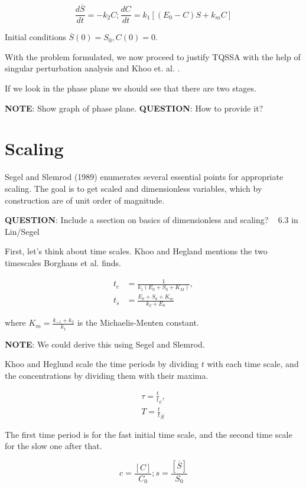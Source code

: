 \documentclass[12pt]{report}
\begin{document}
\begin{equation}
\frac{d\overline{S}}{dt} = -k_2C;
\frac{dC}{dt} = k_1[(E_0-C)S + k_mC]
\end{equation}

Initial conditions $\overline{S}(0)=S_0, C(0)=0$.

With the problem formulated, we now proceed to justify TQSSA with the help of singular perturbation analysis and Khoo et. al. \cite{Khoo}.

If we look in the phase plane we should see that there are two stages.

\textbf{NOTE}: Show graph of phase plane.
\textbf{QUESTION}: How to provide it?

\section{Scaling}

Segel and Slemrod (1989) enumerates several essential points for appropriate scaling. The goal is to get scaled and dimensionless variables, which by construction are of unit order of magnitude.

\textbf{QUESTION}: Include a ssection on basics of dimensionless and scaling? ~ 6.3 in Lin/Segel

First, let's think about time scales. Khoo and Hegland mentions the two timescales Borghans et al. finds.

\begin{align*}
t_c &= \frac{1}{k_1(E_0+S_0+K_M)}, \\
t_{\overline{s}} &= \frac{E_0+S_0+K_m}{k_2+E_0}
\end{align*}

where $K_m = \frac{k_{-1} + k_{2}}{k_1}$ is the Michaelis-Menten constant.

\textbf{NOTE}: We could derive this using Segel and Slemrod.

Khoo and Heglund scale the time periods by dividing $t$ with each time scale, and the concentrations by dividing them with their maxima.

\begin{align*}
\tau = \frac t t_c, \\
T = \frac t t_{\overline{S}}
\end{align*}

The first time period is for the fast initial time scale, and the second time scale for the slow one after that.

\begin{equation}
c = \frac{[C]}{C_0}; s = \frac{[\overline{S}]}{S_0}
\end{equation}
\end{document}
